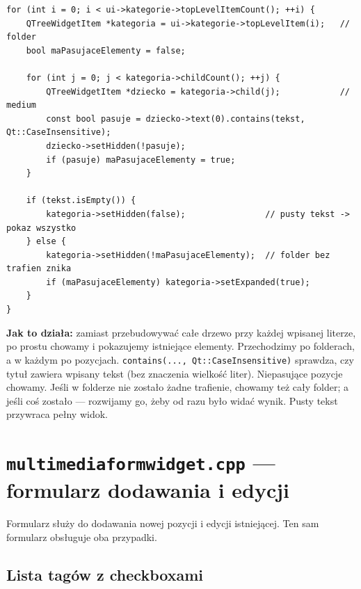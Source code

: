 \documentclass[11pt,a4paper]{article}
\begin{document}
\begin{lstlisting}[caption={Ukrywanie niepasujących pozycji bez przebudowy drzewa}]
for (int i = 0; i < ui->kategorie->topLevelItemCount(); ++i) {
    QTreeWidgetItem *kategoria = ui->kategorie->topLevelItem(i);   // folder
    bool maPasujaceElementy = false;

    for (int j = 0; j < kategoria->childCount(); ++j) {
        QTreeWidgetItem *dziecko = kategoria->child(j);            // medium
        const bool pasuje = dziecko->text(0).contains(tekst, Qt::CaseInsensitive);
        dziecko->setHidden(!pasuje);
        if (pasuje) maPasujaceElementy = true;
    }

    if (tekst.isEmpty()) {
        kategoria->setHidden(false);                // pusty tekst -> pokaz wszystko
    } else {
        kategoria->setHidden(!maPasujaceElementy);  // folder bez trafien znika
        if (maPasujaceElementy) kategoria->setExpanded(true);
    }
}
\end{lstlisting}

\textbf{Jak to działa:} zamiast przebudowywać całe drzewo przy każdej wpisanej
literze, po prostu chowamy i pokazujemy istniejące elementy. Przechodzimy po
folderach, a w każdym po pozycjach. \texttt{contains(..., Qt::CaseInsensitive)}
sprawdza, czy tytuł zawiera wpisany tekst (bez znaczenia wielkość liter).
Niepasujące pozycje chowamy. Jeśli w folderze nie zostało żadne trafienie,
chowamy też cały folder; a jeśli coś zostało --- rozwijamy go, żeby od razu było
widać wynik. Pusty tekst przywraca pełny widok.

\section{\texttt{multimediaformwidget.cpp} --- formularz dodawania i edycji}

Formularz służy do dodawania nowej pozycji i edycji istniejącej. Ten sam
formularz obsługuje oba przypadki.

\subsection{Lista tagów z checkboxami}
\end{document}
